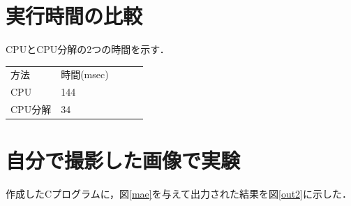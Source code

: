 \documentclass[11pt]{jarticle}
\begin{document}
\section{実行時間の比較}
CPUとCPU分解の2つの時間を示す．
\begin{table}[h]
    \centering
    \begin{tabular}{l|llll}
    \cline{1-2}
    方法    & 時間(msec) &  &  &  \\ \cline{1-2}
    CPU   & 144      &  &  &  \\
    CPU分解 & 34       &  &  &  \\ \cline{1-2}
    \end{tabular}
    \end{table}

\section{自分で撮影した画像で実験}
作成したCプログラムに，図\ref{mae}を与えて出力された結果を図\ref{out2}に示した．
\end{document}
